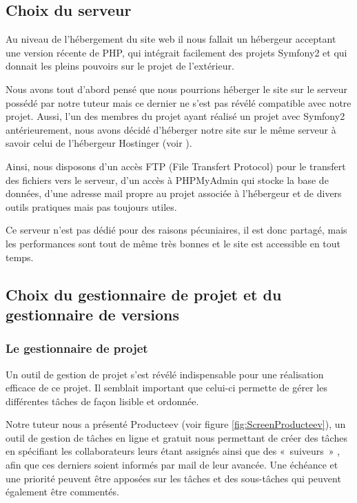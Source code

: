 \subsection{Choix du serveur}

Au niveau de l'hébergement du site web il nous fallait un hébergeur acceptant une version récente de PHP, qui intégrait facilement des projets Symfony2 et qui donnait les pleins pouvoirs sur le projet de l'extérieur.

Nous avons tout d'abord pensé que nous pourrions héberger le site sur le serveur possédé par notre tuteur mais ce dernier ne s'est pas révélé compatible avec notre projet. Aussi, l'un des membres du projet ayant réalisé un projet avec Symfony2 antérieurement, nous avons décidé d'héberger notre site sur le même serveur à savoir celui de l'hébergeur Hostinger (voir \cite{hostinger}).

Ainsi, nous disposons d'un accès FTP (File Transfert Protocol) pour le transfert des fichiers vers le serveur, d'un accès à PHPMyAdmin qui stocke la base de données, d'une adresse mail propre au projet associée à l'hébergeur et de divers outils pratiques mais pas toujours utiles.

Ce serveur n'est pas dédié pour des raisons pécuniaires, il est donc partagé, mais les performances sont tout de même très bonnes et le site est accessible en tout temps.

\subsection{Choix du gestionnaire de projet et du gestionnaire 
de versions}

\subsubsection{Le gestionnaire de projet}

Un outil de gestion de projet s'est révélé indispensable pour une réalisation efficace de ce projet. Il semblait important que celui-ci permette de gérer les différentes tâches de façon lisible et ordonnée.

Notre tuteur nous a présenté Producteev (voir figure \ref{fig:ScreenProducteev}), un outil de gestion de tâches en ligne et gratuit nous permettant de créer des tâches en spécifiant les collaborateurs leurs étant assignés ainsi que des «~suiveurs~» , afin que ces derniers soient informés par mail de leur avancée. Une échéance et une priorité peuvent être apposées sur les tâches et des sous-tâches qui peuvent également être commentés.

